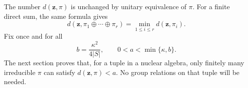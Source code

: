 The number $d(\mathbf z,\pi)$ is unchanged by unitary equivalence of
$\pi$. For a finite direct sum, the same formula gives
\begin{equation}\label{eq:block-minimum}
 d(\mathbf z,\pi_1\oplus\cdots\oplus\pi_r)
   =\min_{1\le i\le r}d(\mathbf z,\pi_i).
\end{equation}
Fix once and for all
\begin{equation}\label{eq:thresholds}
 b=\frac{\kappa^2}{4|S|},\qquad 0<a<\min\{\kappa,b\}.
\end{equation}
The next section proves that, for a tuple in a nuclear algebra, only
finitely many irreducible $\pi$ can satisfy $d(\mathbf z,\pi)<a$.
No group relations on that tuple will be needed.
